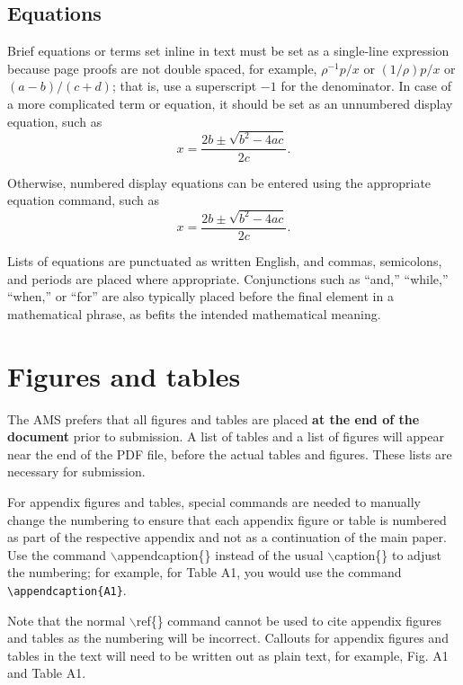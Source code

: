 \documentclass{ametsocV5}
\begin{document}
\subsection{Equations}
Brief equations or terms set inline in text must be set as a single-line
expression because page proofs are not double spaced, for example,
$\rho^{-1}p/x$ or $(1/{\rho})p/x$ or $(a-b)/(c+d)$; that is, use a
superscript $-1$ for the denominator. In case of a more complicated term or
equation, it should be set as an unnumbered display equation, such as
\begin{displaymath} x=\frac{2b\pm\sqrt{b^{2}-4ac}}{2c}.  \end{displaymath}

Otherwise, numbered display equations can be entered using the appropriate
equation command, such as \begin{equation}
x=\frac{2b\pm\sqrt{b^{2}-4ac}}{2c}.  \end{equation}

Lists of equations are punctuated as written English, and commas, semicolons,
and periods are placed where appropriate. Conjunctions such as ``and,''
``while,'' ``when,'' or ``for'' are also typically placed before the final
element in a mathematical phrase, as befits the intended mathematical
meaning.  



\section{Figures and tables}
The AMS prefers that all figures and tables are placed {\bf at the end of the document} prior to submission. 
A list of tables and a list of figures will appear near the end of the PDF
file, before the actual tables and figures. These lists are necessary for submission.

For appendix figures and tables, special commands are needed to manually 
change the numbering to ensure that each appendix figure or table is numbered 
as part of the respective appendix and not as a continuation of the main paper. Use the command
$\backslash$appendcaption\{\} instead of the usual $\backslash$caption\{\} to adjust the 
numbering; for example, for Table A1, you would use the command \verb+\appendcaption{A1}+.

Note that the normal $\backslash$ref\{\} command cannot be used to cite 
appendix figures and tables as the numbering will be incorrect. Callouts for appendix figures 
and tables in the text will need to be written out as plain text, for example, Fig. A1 and Table A1.
\end{document}
